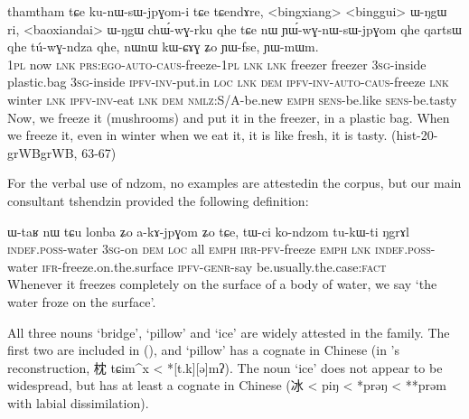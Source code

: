 \documentclass[oldfontcommands,oneside,a4paper,11pt]{article}
\newcommand{\ipa}[1]{{\phon \mbox{#1}}} %
\newcommand{\zh}[1]{{\cn #1}}
\begin{document}
\begin{exe}
\ex
\gll \ipa{iʑora}  	\ipa{thamtham}  	\ipa{tɕe}  	\ipa{ku-nɯ-sɯ-jpɣom-i}  	\ipa{tɕe}  	\ipa{tɕendɤre,}  
<bingxiang>  	<binggui>  	\ipa{ɯ-ŋgɯ}  	\ipa{ri,}  	<baoxiandai>  	\ipa{ɯ-ŋgɯ}  	\ipa{chɯ́-wɣ-rku}  	\ipa{qhe} \ipa{tɕe}  	\ipa{nɯ}  	\ipa{ɲɯ́-wɣ-nɯ-sɯ-jpɣom}  	\ipa{qhe}  	\ipa{qartsɯ}  	\ipa{qhe}  	\ipa{tú-wɣ-ndza}  	\ipa{qhe,}  \ipa{nɯnɯ}  	\ipa{kɯ-ɕɤɣ}  	\ipa{ʑo}  	\ipa{ɲɯ-fse,}  	\ipa{ɲɯ-mɯm.}   \\
\textsc{1pl} now \textsc{lnk} \textsc{prs:ego-auto-caus}-freeze-\textsc{1pl} \textsc{lnk} \textsc{lnk} freezer freezer \textsc{3sg}-inside plastic.bag \textsc{3sg}-inside \textsc{ipfv-inv}-put.in \textsc{loc} \textsc{lnk} \textsc{dem} \textsc{ipfv-inv-auto-caus}-freeze \textsc{lnk} winter \textsc{lnk} \textsc{ipfv-inv}-eat \textsc{lnk} \textsc{dem} \textsc{nmlz}:S/A-be.new \textsc{emph} \textsc{sens}-be.like \textsc{sens}-be.tasty \\
\glt Now, we freeze it (mushrooms) and put it in the freezer, in a plastic bag. When we freeze it, even in winter when we eat it, it is like fresh, it is tasty. (hist-20-grWBgrWB, 63-67)
\end{exe} 


For the verbal use of \ipa{ndzom}, no examples are attestedin the corpus, but our main consultant tshendzin provided the following definition:

\begin{exe}
\ex
\gll \ipa{tɯ-ci}  	\ipa{ɯ-taʁ}  	\ipa{nɯ} \ipa{tɕu}  	\ipa{lonba}  	\ipa{ʑo}  	\ipa{a-kɤ-jpɣom}  	\ipa{ʑo}  	\ipa{tɕe,}  	\ipa{tɯ-ci}  	\ipa{ko-ndzom}  	\ipa{tu-kɯ-ti}  	\ipa{ŋgrɤl}  	\\
\textsc{indef.poss}-water \textsc{3sg}-on \textsc{dem} \textsc{loc} all \textsc{emph} \textsc{irr-pfv}-freeze \textsc{emph} \textsc{lnk}  \textsc{indef.poss}-water \textsc{ifr}-freeze.on.the.surface \textsc{ipfv-genr}-say be.usually.the.case:\textsc{fact} \\
\glt Whenever it freezes completely on the surface of a body of water, we say `the water froze on the surface'.
\end{exe} 

All three nouns `bridge',  `pillow' and `ice' are widely attested in the family. The first two are included in (\citealt[257, 272]{matisoff03}), and `pillow' has a cognate in Chinese (in \citealt{bs14oc}'s reconstruction, \zh{枕} \ipa{tɕim^x} < *\ipa{[t.k][ə]mʔ}). The noun `ice' does not appear to be widespread, but has at least a cognate in Chinese (\zh{冰} < \ipa{piŋ} < *\ipa{prəŋ} <  **\ipa{prəm} with labial dissimilation).
\end{document}
